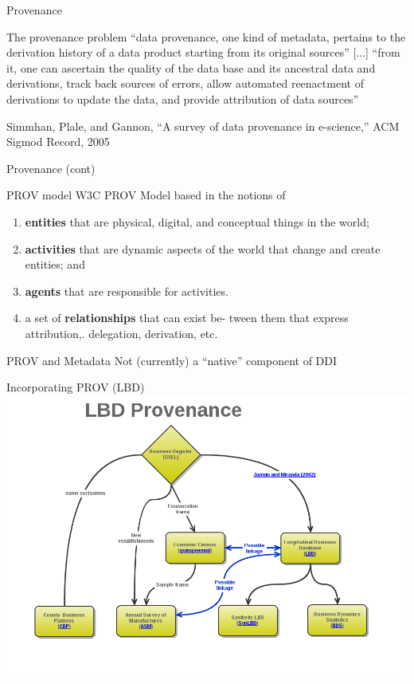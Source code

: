\begin{frame}{Provenance}
	\begin{block}{The provenance problem}
		``data provenance, one kind of metadata, pertains to the derivation history of a
		data product starting from its original sources'' [...]  ``from it, one can ascertain
		the quality of the data base and its ancestral data and derivations, track back sources
		of errors, allow automated reenactment of derivations to update the data, and provide 
		attribution of data sources'' 
	\end{block}
	{\tiny Simmhan, Plale, and Gannon, ``A survey of data provenance in e-science,'' ACM Sigmod Record, 2005}
\end{frame}


\begin{frame}{Provenance (cont)}
	\begin{block}{PROV model}
		W3C PROV Model  based in the notions of 
		\begin{enumerate}
			\item \textbf{entities} that are physical, digital, and conceptual
			things in the world; 
			\item \textbf{activities} that are dynamic aspects of the world that change and
			create entities; and 
			\item \textbf{agents} that are responsible for activities. 
			\item  a set of \textbf{relationships} that can exist be-
			tween them that express attribution,. delegation, derivation, etc.
		\end{enumerate}
	\end{block}
	\begin{block}{PROV and Metadata}
		Not (currently) a ``native'' component of DDI
	\end{block}
\end{frame}

\begin{frame}{Incorporating PROV (LBD)}
	\includegraphics[width=\textwidth]{LBD_Provenance.png}
\end{frame}


